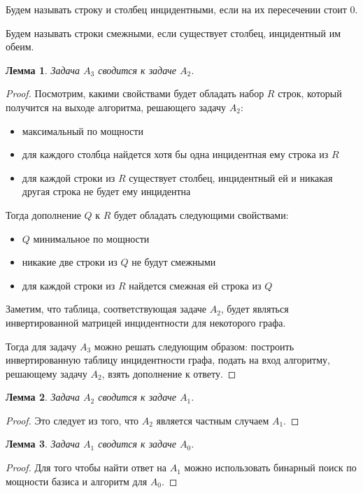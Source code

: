\documentclass[a4paper,14pt]{extreport}
\newtheorem{lm}{Лемма}
\begin{document}
Будем называть строку и столбец инцидентными, если на их пересечении стоит 0. 

Будем называть строки смежными, если существует столбец, инцидентный им обеим.

\begin{lm}
Задача $A_3$ сводится к задаче $A_2$.
\end{lm}
\begin{proof}
Посмотрим, какими свойствами будет обладать набор $R$ строк, который получится на выходе алгоритма, решающего задачу $A_2$:
\begin{itemize}
\item максимальный по мощности    
\item для каждого столбца найдется хотя бы одна инцидентная ему строка из $R$
\item для каждой строки из $R$ существует столбец, инцидентный ей и никакая другая строка не будет ему инцидентна     
\end{itemize}

Тогда дополнение $Q$ к $R$ будет обладать следующими свойствами:
\begin{itemize}
\item $Q$ минимальное по мощности    
\item никакие две строки из $Q$ не будут смежными
\item для каждой строки из $R$ найдется смежная ей строка из $Q$     
\end{itemize}

Заметим, что таблица, соответствующая задаче $A_2$, будет являться инвертированной матрицей инцидентности для некоторого графа.

Тогда для задачу $A_3$ можно решать следующим образом: построить инвертированную таблицу инцидентности графа, подать на вход алгоритму, решающему задачу $A_2$, взять дополнение к ответу.
\end{proof}

\begin{lm}
Задача $A_2$ сводится к задаче $A_1$.
\end{lm}
\begin{proof}
Это следует из того, что $A_2$ является частным случаем $A_1$.
\end{proof}

\begin{lm}
Задача $A_1$ сводится к задаче $A_0$.
\end{lm}
\begin{proof}
Для того чтобы найти ответ на $A_1$ можно использовать бинарный поиск по мощности базиса и алгоритм для $A_0$.
\end{proof}
\end{document}
